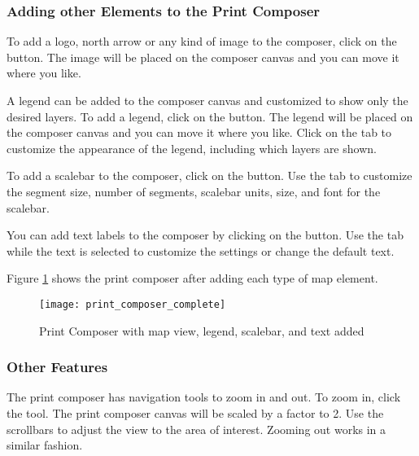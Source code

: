 \subsubsection{Adding other Elements to the Print Composer} 
 
To add a logo, north arrow or any  kind of image to the composer, click on
the 
button. The image will 
be placed on the composer canvas and you can move it where you like. 

A legend can be added to the composer canvas and customized to show only the
desired layers. To add a legend, click on the
button. The legend will be
placed on the composer canvas and you can move it where you like. Click on
the  tab to customize the appearance of the legend, including
which layers are shown.

To add a scalebar to the composer, click on the
button. Use the 
tab to customize the segment size, number of segments, scalebar units, size,
and font for the scalebar.

You can add text labels to the composer by clicking on the
button. Use the  tab
while the text is selected to customize the settings or change the default text.

Figure \ref{fig:print_composer_complete} shows the print composer after adding
each type of map element.
\begin{figure}[h]
   \begin{center}
   \caption{Print Composer with map view, legend, scalebar, and text added}
   \label{fig:print_composer_complete}\smallskip
   \texttt{[image: print\_composer\_complete]}
\end{center}  
\end{figure}

\subsubsection{Other Features}

The print composer has navigation tools to zoom in and out. To zoom in, click
the  tool. The print composer canvas will be scaled by a factor to 2. Use
the scrollbars to adjust the view to the area of interest. Zooming out works
in a similar fashion.

